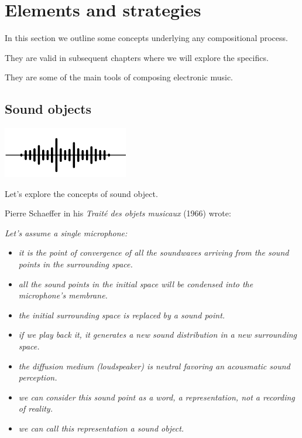 \section{Elements and strategies}\label{elements-and-strategies}

In this section we outline some concepts underlying any compositional process.

They are valid in subsequent chapters where we will explore the
specifics.

They are some of the main tools of composing electronic music.

\subsection{Sound objects}\label{sound-objects}

\begin{center}
\includegraphics[scale=0.4]{../img/sound.png}
\end{center}

Let's explore the concepts of sound object.

Pierre Schaeffer in his \textit{Traité des objets musicaux} (1966) wrote:

\textit{Let's assume a single microphone:}

\begin{itemize}
\tightlist
\item \textit{it is the point of convergence of all the soundwaves arriving from the sound points in the surrounding space.}
\item \textit{all the sound points in the initial space will be condensed into the microphone's membrane.}
\item \textit{the initial surrounding space is replaced by a sound point.}
\item \textit{if we play back it, it generates a new sound distribution in a new surrounding space.}
\item \textit{the diffusion medium (loudspeaker) is neutral favoring an acousmatic sound perception.}
\item \textit{we can consider this sound point as a word, a representation, not a recording of reality.}
\item \textit{we can call this representation a \textit{sound object}.}
\end{itemize}

